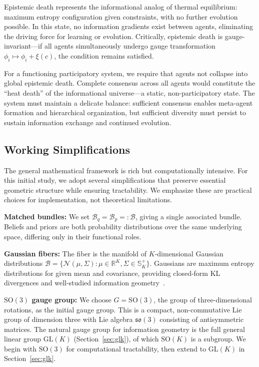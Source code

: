 \documentclass[11pt]{article}
\begin{document}
Epistemic death represents the informational analog of thermal equilibrium: maximum entropy configuration given constraints, with no further evolution possible. In this state, no information gradients exist between agents, eliminating the driving force for learning or evolution. Critically, epistemic death is gauge-invariant---if all agents simultaneously undergo gauge transformation $\phi_i \mapsto \phi_i + \xi(c)$, the condition remains satisfied.

For a functioning participatory system, we require that agents not collapse into global epistemic death. Complete consensus across all agents would constitute the ``heat death'' of the informational universe---a static, non-participatory state. The system must maintain a delicate balance: sufficient consensus enables meta-agent formation and hierarchical organization, but sufficient diversity must persist to sustain information exchange and continued evolution.

\subsection{Working Simplifications}
\label{sec:simplifications}

The general mathematical framework is rich but computationally intensive. For this initial study, we adopt several simplifications that preserve essential geometric structure while ensuring tractability. We emphasize these are practical choices for implementation, not theoretical limitations.

\textbf{Matched bundles:} We set $\mathcal{B}_q = \mathcal{B}_p =: \mathcal{B}$, giving a single associated bundle. Beliefs and priors are both probability distributions over the same underlying space, differing only in their functional roles.

\textbf{Gaussian fibers:} The fiber is the manifold of $K$-dimensional Gaussian distributions $\mathcal{B} = \{\mathcal{N}(\mu, \Sigma) : \mu \in \mathbb{R}^K, \Sigma \in \mathbb{S}^+_K\}$. Gaussians are maximum entropy distributions for given mean and covariance, providing closed-form KL divergences and well-studied information geometry~\cite{Amari2016}.

\textbf{$\mathrm{SO}(3)$ gauge group:} We choose $G = \mathrm{SO}(3)$, the group of three-dimensional rotations, as the initial gauge group. This is a compact, non-commutative Lie group of dimension three with Lie algebra $\mathfrak{so}(3)$ consisting of antisymmetric matrices. The natural gauge group for information geometry is the full general linear group $\mathrm{GL}(K)$ (Section~\ref{sec:glk}), of which $\mathrm{SO}(K)$ is a subgroup. We begin with $\mathrm{SO}(3)$ for computational tractability, then extend to $\mathrm{GL}(K)$ in Section~\ref{sec:glk}.
\end{document}
